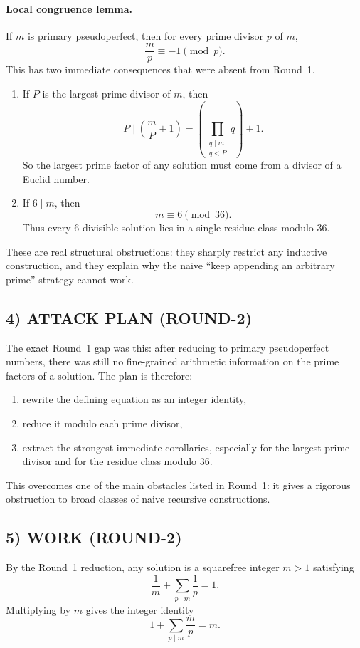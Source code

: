 \paragraph{Local congruence lemma.}
If $m$ is primary pseudoperfect, then for every prime divisor $p$ of $m$,
\[
\frac{m}{p}\equiv -1 \pmod p.
\]
This has two immediate consequences that were absent from Round~1.
\begin{enumerate}
\item If $P$ is the largest prime divisor of $m$, then
\[
P\mid \left(\frac{m}{P}+1\right)=\left(\prod_{\substack{q\mid m \\ q<P}} q\right)+1.
\]
So the largest prime factor of any solution must come from a divisor of a Euclid number.
\item If $6\mid m$, then
\[
m\equiv 6 \pmod{36}.
\]
Thus every $6$-divisible solution lies in a single residue class modulo $36$.
\end{enumerate}
These are real structural obstructions: they sharply restrict any inductive construction, and they explain why the naive ``keep appending an arbitrary prime'' strategy cannot work.

\subsection*{4) ATTACK PLAN (ROUND-2)}
The exact Round~1 gap was this: after reducing to primary pseudoperfect numbers, there was still no fine-grained arithmetic information on the prime factors of a solution.  The plan is therefore:
\begin{enumerate}
\item rewrite the defining equation as an integer identity,
\item reduce it modulo each prime divisor,
\item extract the strongest immediate corollaries, especially for the largest prime divisor and for the residue class modulo $36$.
\end{enumerate}
This overcomes one of the main obstacles listed in Round~1: it gives a rigorous obstruction to broad classes of naive recursive constructions.

\subsection*{5) WORK (ROUND-2)}
By the Round~1 reduction, any solution is a squarefree integer $m>1$ satisfying
\[
\frac1m+\sum_{p\mid m}\frac1p=1.
\]
Multiplying by $m$ gives the integer identity
\[
1+\sum_{p\mid m}\frac{m}{p}=m.
\]

